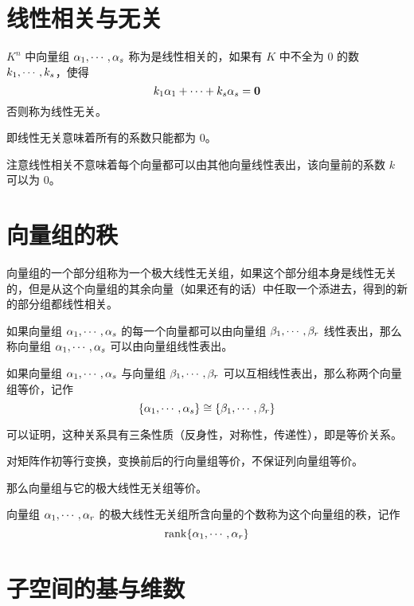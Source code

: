 \section{线性相关与无关}

\begin{definition}
	$K^n$ 中向量组 $\alpha_1,\cdots,\alpha_s$ 称为是线性相关的，如果有 $K$ 中不全为 $0$ 的数 $k_1,\cdots,k_s$，使得
	\[k_1\alpha_1+\cdots+k_s\alpha_s=\boldsymbol{0}\]
	否则称为线性无关。
\end{definition}

即线性无关意味着所有的系数只能都为 $0$。

注意线性相关不意味着每个向量都可以由其他向量线性表出，该向量前的系数 $k$ 可以为 $0$。

\section{向量组的秩}

\begin{definition}[极大线性无关组]
	向量组的一个部分组称为一个极大线性无关组，如果这个部分组本身是线性无关的，但是从这个向量组的其余向量（如果还有的话）中任取一个添进去，得到的新的部分组都线性相关。
\end{definition}

如果向量组 $\alpha_1,\cdots,\alpha_s$ 的每一个向量都可以由向量组 $\beta_1,\cdots,\beta_r$ 线性表出，那么称向量组 $\alpha_1,\cdots,\alpha_s$ 可以由向量组线性表出。

\begin{definition}
	如果向量组 $\alpha_1,\cdots,\alpha_s$ 与向量组 $\beta_1,\cdots,\beta_r$ 可以互相线性表出，那么称两个向量组等价，记作
	\[\{\alpha_1,\cdots,\alpha_s\} \cong \{\beta_1,\cdots,\beta_r\}\]
\end{definition}

可以证明，这种关系具有三条性质（反身性，对称性，传递性），即是等价关系。

对矩阵作初等行变换，变换前后的行向量组等价，不保证列向量组等价。

那么向量组与它的极大线性无关组等价。

\begin{definition}
	向量组 $\alpha_1,\cdots,\alpha_r$ 的极大线性无关组所含向量的个数称为这个向量组的秩，记作
	\[\operatorname{rank}\{\alpha_1,\cdots,\alpha_r\}\]
\end{definition}

\section{子空间的基与维数}

